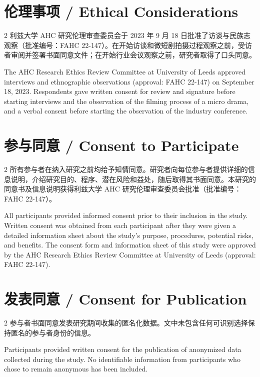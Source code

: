 \documentclass[10pt,a4paper]{article}
\begin{document}
\section*{伦理事项 / Ethical Considerations}
\begin{paracol}{2}
利兹大学 AHC 研究伦理审查委员会于 2023 年 9 月 18 日批准了访谈与民族志观察（批准编号：FAHC 22-147）。在开始访谈和微短剧拍摄过程观察之前，受访者审阅并签署书面同意文件；在开始行业会议观察之前，研究者取得了口头同意。\par
\switchcolumn
The AHC Research Ethics Review Committee at University of Leeds approved interviews and ethnographic observations (approval: FAHC 22-147) on September 18, 2023. Respondents gave written consent for review and signature before starting interviews and the observation of the filming process of a micro drama, and a verbal consent before starting the observation of the industry conference.\par
\switchcolumn*
\end{paracol}
\section*{参与同意 / Consent to Participate}
\begin{paracol}{2}
所有参与者在纳入研究之前均给予知情同意。研究者向每位参与者提供详细的信息说明，介绍研究目的、程序、潜在风险和益处，随后取得其书面同意。本研究的同意书及信息说明获得利兹大学 AHC 研究伦理审查委员会批准（批准编号：FAHC 22-147）。\par
\switchcolumn
All participants provided informed consent prior to their inclusion in the study. Written consent was obtained from each participant after they were given a detailed information sheet about the study’s purpose, procedures, potential risks, and benefits. The consent form and information sheet of this study were approved by the AHC Research Ethics Review Committee at University of Leeds (approval: FAHC 22-147).\par
\switchcolumn*
\end{paracol}
\section*{发表同意 / Consent for Publication}
\begin{paracol}{2}
参与者书面同意发表研究期间收集的匿名化数据。文中未包含任何可识别选择保持匿名的参与者身份的信息。\par
\switchcolumn
Participants provided written consent for the publication of anonymized data collected during the study. No identifiable information from participants who chose to remain anonymous has been included.\par
\switchcolumn*
\end{paracol}
\end{document}
